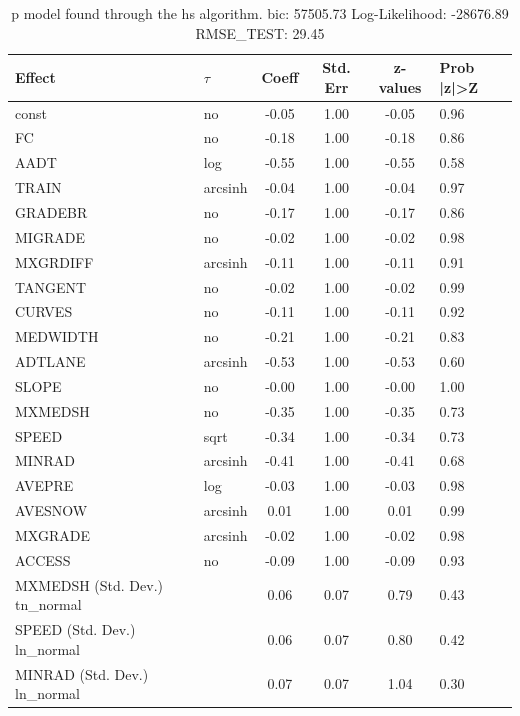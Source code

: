 \begin{table}
	\caption{p model found through the hs algorithm. bic: 57505.73 Log-Likelihood: -28676.89 RMSE_TEST: 29.45}
	\begin{center}
		\begin{tabular}{|l|l|c|c|c|l|}
			\hline
			Effect & $\tau$ & Coeff & Std. Err & z-values & Prob |z|>Z \\
			\hline
			const & no & -0.05 & 1.00 & -0.05 & 0.96 \\
			\hline
			FC & no & -0.18 & 1.00 & -0.18 & 0.86 \\
			\hline
			AADT & log & -0.55 & 1.00 & -0.55 & 0.58 \\
			\hline
			TRAIN & arcsinh & -0.04 & 1.00 & -0.04 & 0.97 \\
			\hline
			GRADEBR & no & -0.17 & 1.00 & -0.17 & 0.86 \\
			\hline
			MIGRADE & no & -0.02 & 1.00 & -0.02 & 0.98 \\
			\hline
			MXGRDIFF & arcsinh & -0.11 & 1.00 & -0.11 & 0.91 \\
			\hline
			TANGENT & no & -0.02 & 1.00 & -0.02 & 0.99 \\
			\hline
			CURVES & no & -0.11 & 1.00 & -0.11 & 0.92 \\
			\hline
			MEDWIDTH & no & -0.21 & 1.00 & -0.21 & 0.83 \\
			\hline
			ADTLANE & arcsinh & -0.53 & 1.00 & -0.53 & 0.60 \\
			\hline
			SLOPE & no & -0.00 & 1.00 & -0.00 & 1.00 \\
			\hline
			MXMEDSH & no & -0.35 & 1.00 & -0.35 & 0.73 \\
			\hline
			SPEED & sqrt & -0.34 & 1.00 & -0.34 & 0.73 \\
			\hline
			MINRAD & arcsinh & -0.41 & 1.00 & -0.41 & 0.68 \\
			\hline
			AVEPRE & log & -0.03 & 1.00 & -0.03 & 0.98 \\
			\hline
			AVESNOW & arcsinh & 0.01 & 1.00 & 0.01 & 0.99 \\
			\hline
			MXGRADE & arcsinh & -0.02 & 1.00 & -0.02 & 0.98 \\
			\hline
			ACCESS & no & -0.09 & 1.00 & -0.09 & 0.93 \\
			\hline
			MXMEDSH (Std. Dev.) tn_normal &  & 0.06 & 0.07 & 0.79 & 0.43 \\
			\hline
			SPEED (Std. Dev.) ln_normal &  & 0.06 & 0.07 & 0.80 & 0.42 \\
			\hline
			MINRAD (Std. Dev.) ln_normal &  & 0.07 & 0.07 & 1.04 & 0.30 \\

\end{tabular}
\end{center}
\end{table}
